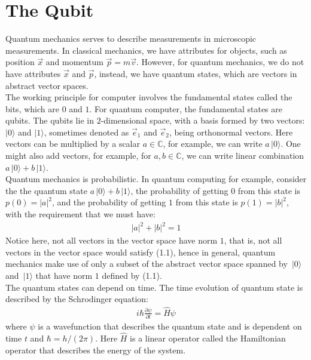 \documentclass[11pt]{book}
\theoremstyle{break}
\theoremstyle{break}
\newcommand{\C}{\mathbb{C}}
\newcommand{\pd}{\partial}
\newcommand{\ket}[1]{\,| #1 \rangle}
\begin{document}
\section[The Qubit]{\color{red}The Qubit\color{black}}
Quantum mechanics serves to describe measurements in microscopic measurements. In classical mechanics, we have attributes for objects, such as position $\vec{x}$ and momentum $\vec{p}= m\vec{v}$. However, for quantum mechanics, we do not have attributes $\vec{x}$ and $\vec{p}$, instead, we have quantum states, which are vectors in abstract vector spaces. \\

The working principle for computer involves the fundamental states called the bits, which are $0$ and $1$. For quantum computer, the fundamental states are qubits. The qubits lie in $2$-dimensional space, with a basis formed by two vectors: $|0\rangle$ and $|1\rangle$, sometimes denoted as $\vec{e}_1$ and $\vec{e}_2$, being orthonormal vectors. Here vectors can be multiplied by a scalar $a\in \C$, for example, we can write $a\, |0\rangle$. One might also add vectors, for example, for $a,b \in \C$, we can write linear combination $a\, |0\rangle + b \, |1 \rangle$. \\

Quantum mechanics is probabilistic. In quantum computing for example, consider the the quantum state $a\,|0\rangle + b \, | 1\rangle$, the probability of getting $0$ from this state is $p(0) = |a|^2$, and the probability of getting $1$ from this state is $p(1) = |b|^2$, with the requirement that we must have:
\begin{align}
|a|^2 + |b|^2 = 1
\end{align}
Notice here, not all vectors in the vector space have norm $1$, that is, not all vectors in the vector space would satisfy (1.1), hence in general, quantum mechanics make use of only a subset of the abstract vector space spanned by $\ket{0}$ and $\ket{1}$ that have norm $1$ defined by (1.1). \\

The quantum states can depend on time. The time evolution of quantum state is described by the Schrodinger equation:
\begin{align}
i\hbar \frac{\pd \psi}{\pd t} = \hat{H}\psi
\end{align}
where $\psi$ is a wavefunction that describes the quantum state and is dependent on time $t$ and $\hbar = h/(2\pi)$. Here $\hat{H}$ is a linear operator called the Hamiltonian operator that describes the energy of the system. \\
\end{document}
